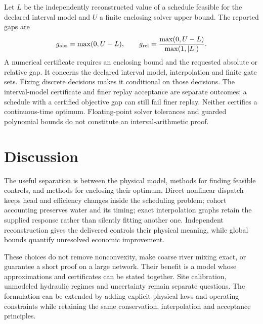 \documentclass[10pt,a4paper]{article}
\begin{document}
Let $L$ be the independently reconstructed value of a schedule feasible
for the declared interval model and $U$ a finite enclosing solver upper bound.
The reported gaps are
\begin{equation}
g_{\rm abs}=\max(0,U-L),\qquad
g_{\rm rel}=\frac{\max(0,U-L)}{\max(1,|L|)}.
\label{eq:gap}
\end{equation}
A numerical certificate requires an enclosing bound and the requested
absolute or relative gap. It concerns the declared interval model,
interpolation and finite gate sets. Fixing discrete decisions makes it
conditional on those decisions. The interval-model certificate and finer
replay acceptance are separate outcomes: a schedule with a certified objective gap can
still fail finer replay. Neither certifies a continuous-time optimum.
Floating-point solver tolerances and guarded polynomial bounds do not
constitute an interval-arithmetic proof.

\section{Discussion}

The useful separation is between the physical model, methods for finding
feasible controls, and methods for enclosing their optimum. Direct nonlinear
dispatch keeps head and efficiency changes inside the scheduling problem;
cohort accounting preserves water and its timing; exact interpolation graphs
retain the supplied response rather than silently fitting another one.
Independent reconstruction gives the delivered controls their physical
meaning, while global bounds quantify unresolved economic improvement.

These choices do not remove nonconvexity, make coarse river mixing exact,
or guarantee a short proof on a large network. Their benefit is a model whose
approximations and certificates can be stated together. Site calibration,
unmodeled hydraulic regimes and uncertainty remain separate questions.
The formulation can be extended by adding explicit physical laws and
operating constraints while retaining the same conservation, interpolation
and acceptance principles.
\end{document}
